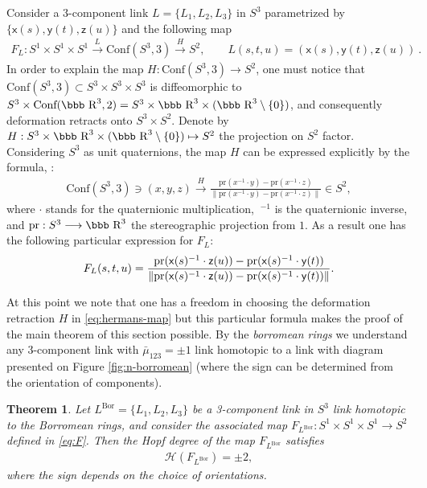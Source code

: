 \documentclass[12pt]{article}
\newtheorem{theorem}{Theorem}[section]
\newcommand{\R}{\mbox{\bbb R}}       %
\newcommand{\Cnf}{\text{Conf}}
\newcommand{\no}{\noindent}
\begin{document}
Consider a 3-component link $L=\{L_1, L_2, L_3\}$ in $S^3$ 
parametrized by $\{\mathsf{x}(s),\mathsf{y}(t),\mathsf{z}(u)\}$ 
and the following map 
\begin{gather}\label{eq:F}
 F_L:S^1\times S^1\times S^1\stackrel{L}{\longrightarrow} \Cnf(S^3,3)\stackrel{H}{\longrightarrow} S^2,\qquad L(s,t,u)=(\mathsf{x}(s), \mathsf{y}(t), \mathsf{z}(u))\ .
\end{gather}
\no In order to explain the map $H:\Cnf(S^3,3)\longrightarrow S^2$, one must notice that 
$\Cnf(S^3,3)\subset S^3\times S^3\times S^3$ is
diffeomorphic to $S^3\times \Cnf(\R^3,2)=S^3\times
\R^3\times (\R^3\setminus\{0\})$, and consequently deformation
retracts onto $S^3\times S^2$. Denote by 
$H:S^3\times \R^3\times (\R^3\setminus\{0\})\mapsto S^2$ the projection on $S^2$ factor. 
Considering $S^3$ as unit quaternions, the map $H$ can be expressed explicitly by the formula, \cite{Deturck-Gluck-Melvin-Shonkwiler08}:
\begin{gather}\label{eq:hermans-map}
 \Cnf(S^3,3) \ni (x,y,z) \stackrel{H}{\longrightarrow}
 \frac{\text{pr}(x^{-1}\cdot y)-\text{pr}(x^{-1}\cdot z)}{\|\text{pr}(x^{-1}\cdot y)-\text{pr}(x^{-1}\cdot z)\|}\in S^2,
\end{gather}
where $\cdot$ stands for the quaternionic multiplication, $\ ^{-1}$
is the quaternionic inverse, and $\text{pr}:S^3\longrightarrow \R^3$ the
stereographic projection from $1$. As a result one has the following particular expression for $F_L$:
\begin{gather}\label{eq:F_L}
\notag F_L(s,t,u)=\frac{\text{pr}(\mathsf{x}(s)^{-1}\cdot \mathsf{z}(u))-\text{pr}(\mathsf{x}(s)^{-1}\cdot \mathsf{y}(t))}{\|\text{pr}(\mathsf{x}(s)^{-1}\cdot \mathsf{z}(u))-\text{pr}(\mathsf{x}(s)^{-1}\cdot
 \mathsf{y}(t))\|}.
\end{gather}

\no At this point we note that one has a freedom in choosing the deformation retraction $H$ in \eqref{eq:hermans-map} but this particular formula makes the proof of the main theorem of this section possible. By the \emph{borromean rings} we understand any $3$-component link with $\bar{\mu}_{123}=\pm 1$ link homotopic to a link with diagram presented on Figure \ref{fig:n-borromean} (where the sign can be determined from the orientation of components).

\begin{theorem}\label{th:milnor-hopf}
 Let $L^\text{Bor}=\{L_1,L_2,L_3\}$ be a 3-component link in $S^3$ link homotopic to the Borromean rings, and consider
 the associated map $F_{L^\text{Bor}}:S^1\times S^1\times S^1\longrightarrow S^2$ defined in \eqref{eq:F}. Then the Hopf degree of the map 
 $F_{L^\text{Bor}}$ satisfies
 \begin{gather}\label{eq:hopf=2}
   \mathscr{H}(F_{L^\text{Bor}})=\pm 2,
 \end{gather}
 where the sign depends on the choice of orientations.
\end{theorem}
\end{document}
